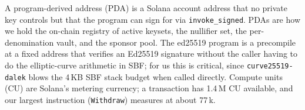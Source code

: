 A program-derived address (PDA) is a Solana account address that no private key controls but that the program can sign for via \texttt{invoke\_signed}. PDAs are how we hold the on-chain registry of active keysets, the nullifier set, the per-denomination vault, and the sponsor pool. The ed25519 program is a precompile at a fixed address that verifies an Ed25519 signature without the caller having to do the elliptic-curve arithmetic in SBF; for us this is critical, since \texttt{curve25519-dalek} blows the 4\,KB SBF stack budget when called directly. Compute units (CU) are Solana's metering currency; a transaction has 1.4\,M CU available, and our largest instruction (\texttt{Withdraw}) measures at about 77\,k.
